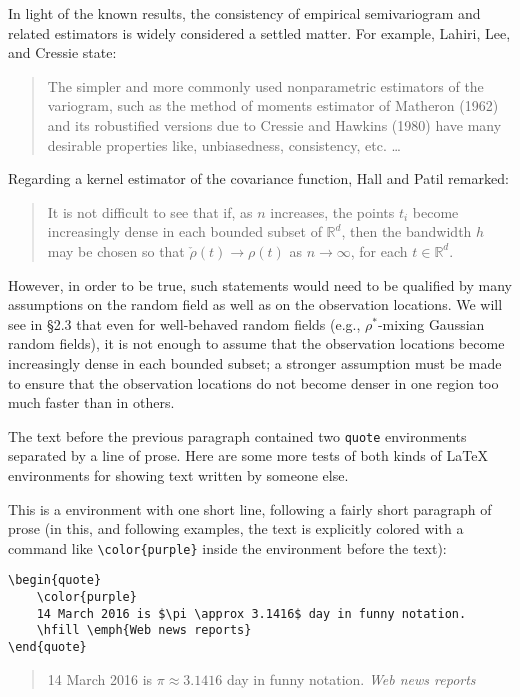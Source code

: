 \begin{itshape}
    In light of the known results, the consistency
    of empirical semivariogram and related
    estimators is widely considered a settled
    matter.  For example, Lahiri, Lee, and Cressie
    \cite{Lahiri:2002:ADA} state:

    \begin{quote}
        The simpler and more commonly used
        nonparametric estimators of the variogram,
        such as the method of moments estimator of
        Matheron (1962) and its robustified
        versions due to Cressie and Hawkins (1980)
        have many desirable properties like,
        unbiasedness, consistency, etc. \ldots
    \end{quote}
    \noindent
    Regarding a kernel estimator of the covariance
    function, Hall and Patil
    \cite{Hall:1994:PNE} remarked:
    \begin{quote}
        It is not difficult to see that if, as $ n
        $ increases, the points $ t_i $ become
        increasingly dense in each bounded subset
        of $ \mathbb{R}^d $, then the bandwidth $
        h $ may be chosen so that $ \check \rho(t)
        \to \rho(t) $ as $ n \to \infty $, for
        each $ t \in \mathbb{R}^d $.
    \end{quote}
    However, in order to be true, such statements
    would need to be qualified by many assumptions
    on the random field as well as on the
    observation locations. We will see in
    \S2.3 that even for well-behaved
    random fields (e.g., $\rho^*$-mixing Gaussian
    random fields), it is not enough to assume
    that the observation locations become
    increasingly dense in each bounded subset; a
    stronger assumption must be made to ensure
    that the observation locations do not become
    denser in one region too much faster than in
    others.
\end{itshape}

The text before the previous paragraph contained
two \texttt{quote} environments separated by a
line of prose.  Here are some more tests of both
kinds of \LaTeX{} environments for showing text
written by someone else.

This is a  environment
with one short line, following a fairly short
paragraph of prose (in this, and following
examples, the text is explicitly colored with a
command like \verb=\color{purple}= inside the
environment before the text):
%
\begin{singlespace}
\color{darkblue}
\begin{verbatim}
\begin{quote}
    \color{purple}
    14 March 2016 is $\pi \approx 3.1416$ day in funny notation.
    \hfill \emph{Web news reports}
\end{quote}
\end{verbatim}
\end{singlespace}
%
\begin{quote}
    \color{purple}
    14 March 2016 is $\pi \approx 3.1416$ day in funny notation.
    \hfill \emph{Web news reports}
\end{quote}

